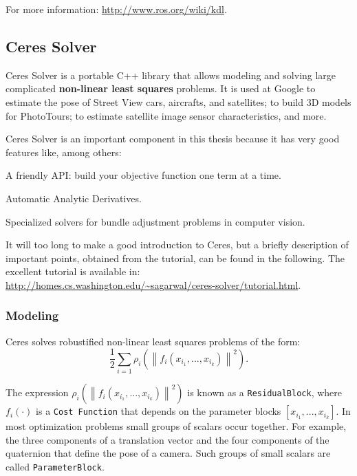 For more information: \url{http://www.ros.org/wiki/kdl}.

\subsection{Ceres Solver}
\label{sec:ceres}

Ceres Solver \cite{ceres} is a portable C++ library that allows modeling and solving large complicated \textbf{non-linear least squares} problems. It is used at Google to estimate the pose of Street View cars, aircrafts, and satellites; to build 3D models for PhotoTours; to estimate satellite image sensor characteristics, and more.

Ceres Solver is an important component in this thesis because it has very good features like, among others:
\begin{itemize*}
\item A friendly API: build your objective function one term at a time.
\item Automatic Analytic Derivatives.
\item Specialized solvers for bundle adjustment problems in computer vision.
\end{itemize*}

It will too long to make a good introduction to Ceres, but a briefly description of important points, obtained from the tutorial, can be found in the following. The excellent tutorial is available in: \url{http://homes.cs.washington.edu/~sagarwal/ceres-solver/tutorial.html}.

\subsubsection*{Modeling}
Ceres solves robustified non-linear least squares problems of the form:
\begin{equation}
\frac{1}{2}\sum_{i=1} \rho_i\left(\left\|f_i\left(x_{i_1}, ... ,x_{i_k}\right)\right\|^2\right).
\end{equation}

The expression $\rho_i\left(\left\|f_i\left(x_{i_1},...,x_{i_k}\right)\right\|^2\right)$ is known as a \texttt{ResidualBlock}, where $f_i(\cdot)$ is a \texttt{Cost Function} that depends on the parameter blocks $\left[x_{i_1},... , x_{i_k}\right]$. In most optimization problems small groups of scalars occur together. For example, the three components of a translation vector and the four components of the quaternion that define the pose of a camera. Such groups of small scalars are called \texttt{ParameterBlock}.

